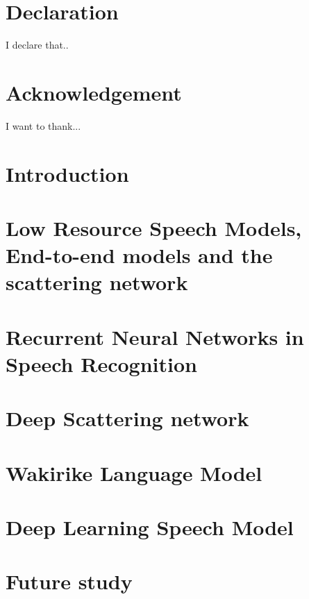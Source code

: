 \documentclass[12pt,twoside]{report}
\begin{document}
\chapter*{Declaration}
I declare that..

\chapter*{Acknowledgement}
I want to thank...

\tableofcontents

\chapter{Introduction}


\chapter{Low Resource Speech Models, End-to-end models and the scattering network}\label{c02}


\chapter{Recurrent Neural Networks in Speech Recognition}\label{ch3RNN}


\chapter{Deep Scattering network}


\chapter{Wakirike Language Model}


\chapter{Deep Learning Speech Model}


\chapter{Future study}





\end{document}
